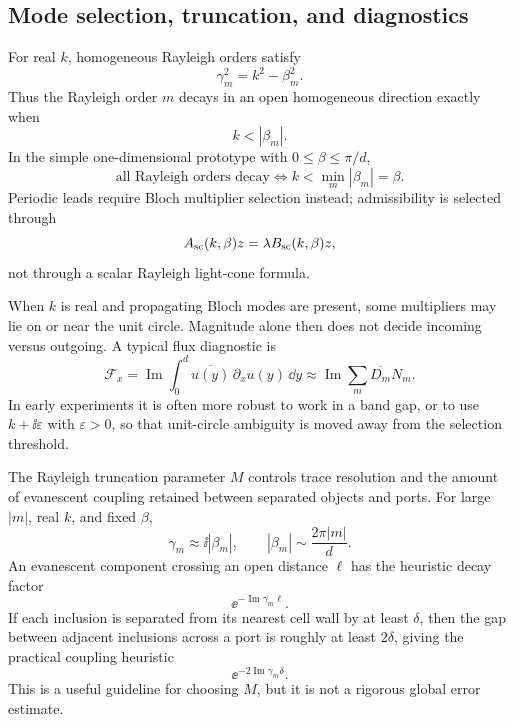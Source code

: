 \subsection{Mode selection, truncation, and diagnostics}

For real \(k\), homogeneous Rayleigh orders satisfy
\[
  \gamma_m^2=k^2-\beta_m^2 .
\]
Thus the Rayleigh order \(m\) decays in an open homogeneous direction exactly
when
\[
  k<|\beta_m|.
\]
In the simple one-dimensional prototype with \(0\le\beta\le\pi/d\),
\[
  \text{all Rayleigh orders decay}
  \iff
  k<\min_m|\beta_m|=\beta .
\]
Periodic leads require Bloch multiplier selection instead; admissibility is
selected through
\[
  A_{\mathrm{sc}}(k,\beta)z=\lambda B_{\mathrm{sc}}(k,\beta)z,
\]
not through a scalar Rayleigh light-cone formula.

When \(k\) is real and propagating Bloch modes are present, some multipliers may
lie on or near the unit circle.  Magnitude alone then does not decide incoming
versus outgoing.  A typical flux diagnostic is
\[
  \mathcal F_x
  =
  \operatorname{Im}\int_0^d \overline{u(y)}\,\partial_xu(y)\,\dd y
  \approx
  \operatorname{Im}\sum_m \overline{D_m}N_m .
\]
In early experiments it is often more robust to work in a band gap, or to use
\(k+\ii\varepsilon\) with \(\varepsilon>0\), so that unit-circle ambiguity is
moved away from the selection threshold.

The Rayleigh truncation parameter \(M\) controls trace resolution and the amount
of evanescent coupling retained between separated objects and ports.  For large
\(|m|\), real \(k\), and fixed \(\beta\),
\[
  \gamma_m\approx \ii|\beta_m|,
  \qquad
  |\beta_m|\sim\frac{2\pi|m|}{d}.
\]
An evanescent component crossing an open distance \(\ell\) has the heuristic
decay factor
\[
  \ee^{-\operatorname{Im}\gamma_m\ell}.
\]
If each inclusion is separated from its nearest cell wall by at least
\(\delta\), then the gap between adjacent inclusions across a port is roughly at
least \(2\delta\), giving the practical coupling heuristic
\[
  \ee^{-2\operatorname{Im}\gamma_m\delta}.
\]
This is a useful guideline for choosing \(M\), but it is not a rigorous global
error estimate.

